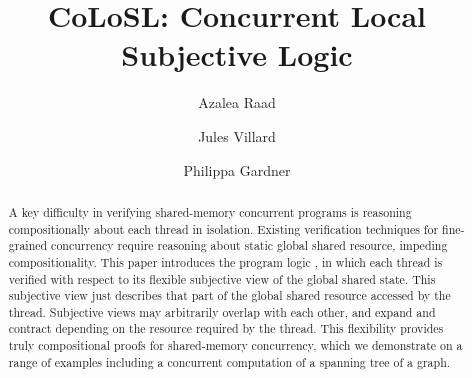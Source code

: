 \documentclass[runningheads,a4paper]{llncs}
\begin{document}
%
\title{CoLoSL: Concurrent Local Subjective Logic}
\author{Azalea Raad\and Jules Villard\and Philippa Gardner}

\maketitle

\begin{abstract}
A key difficulty in verifying shared-memory concurrent programs is
reasoning compositionally about each thread in isolation. Existing
verification techniques for fine-grained concurrency require 
reasoning about static global shared resource, impeding compositionality.  This
paper introduces the program logic \colosl, in which each thread is
verified with respect to its flexible subjective view of the global
shared state.
This subjective view  just describes  that part of the global shared resource accessed by the
thread. Subjective views may arbitrarily overlap with each other, and
expand and contract depending on the resource required by the thread.
This flexibility provides truly compositional proofs for shared-memory
concurrency, which we demonstrate on a range of examples including a
concurrent computation of a spanning tree of a graph.
\end{abstract}

%
%

%
%
%
%
%
\end{document}

